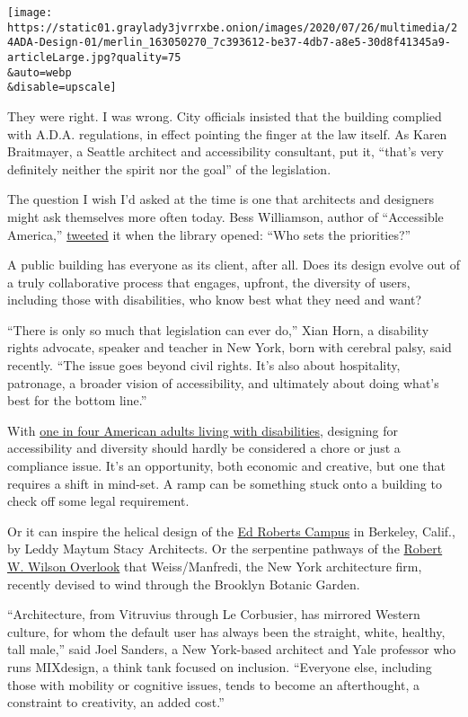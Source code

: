 \texttt{[image: https://static01.graylady3jvrrxbe.onion/images/2020/07/26/multimedia/24ADA-Design-01/merlin\_163050270\_7c393612-be37-4db7-a8e5-30d8f41345a9-articleLarge.jpg?quality=75\\\&auto=webp\\\&disable=upscale]}

They were right. I was wrong. City officials insisted that the building
complied with A.D.A. regulations, in effect pointing the finger at the
law itself. As Karen Braitmayer, a Seattle architect and accessibility
consultant, put it, ``that's very definitely neither the spirit nor the
goal'' of the legislation.

The question I wish I'd asked at the time is one that architects and
designers might ask themselves more often today. Bess Williamson, author
of ``Accessible America,''
\href{https://twitter.com/besswww/status/1180128788065198080}{tweeted}
it when the library opened: ``Who sets the priorities?''

A public building has everyone as its client, after all. Does its design
evolve out of a truly collaborative process that engages, upfront, the
diversity of users, including those with disabilities, who know best
what they need and want?

``There is only so much that legislation can ever do,'' Xian Horn, a
disability rights advocate, speaker and teacher in New York, born with
cerebral palsy, said recently. ``The issue goes beyond civil rights.
It's also about hospitality, patronage, a broader vision of
accessibility, and ultimately about doing what's best for the bottom
line.''

With
\href{https://www.cdc.gov/ncbddd/disabilityandhealth/infographic-disability-impacts-all.html}{one
in four American adults living with disabilities}, designing for
accessibility and diversity should hardly be considered a chore or just
a compliance issue. It's an opportunity, both economic and creative, but
one that requires a shift in mind-set. A ramp can be something stuck
onto a building to check off some legal requirement.

Or it can inspire the helical design of the
\href{https://www.edrobertscampus.org/design/}{Ed Roberts Campus} in
Berkeley, Calif., by Leddy Maytum Stacy Architects. Or the serpentine
pathways of the
\href{http://www.weissmanfredi.com/project/brooklyn-botanic-garden-robert-w-wilson-overlook}{Robert
W. Wilson Overlook} that Weiss/Manfredi, the New York architecture firm,
recently devised to wind through the Brooklyn Botanic Garden.

``Architecture, from Vitruvius through Le Corbusier, has mirrored
Western culture, for whom the default user has always been the straight,
white, healthy, tall male,'' said Joel Sanders, a New York-based
architect and Yale professor who runs MIXdesign, a think tank focused on
inclusion. ``Everyone else, including those with mobility or cognitive
issues, tends to become an afterthought, a constraint to creativity, an
added cost.''

